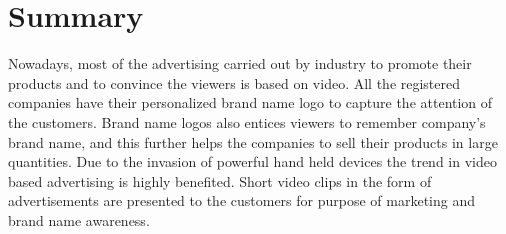\pagebreak
\section{Summary}
Nowadays, most of the advertising carried out by industry to promote their products and to convince the viewers is based on video. All the registered companies have their personalized brand name logo to capture the attention of the customers. Brand name logos also entices viewers to remember company's brand name, and this further helps the companies to sell their products in large quantities. Due to the invasion of powerful hand held devices the trend in video based advertising is highly benefited. Short video clips in the form of advertisements are presented to the customers for purpose of marketing and brand name awareness.    
